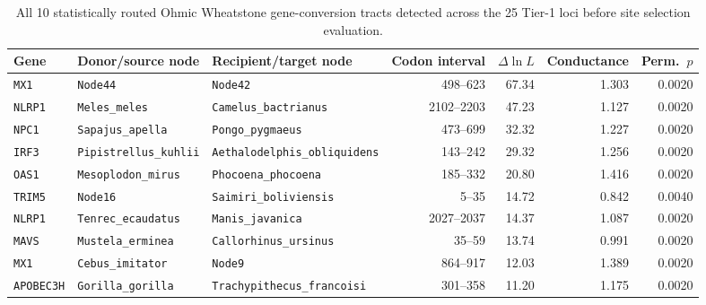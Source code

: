 \begin{table}[htbp]
\centering
\caption{All 10 statistically routed Ohmic Wheatstone gene-conversion tracts detected across the 25 Tier-1 loci before site selection evaluation.}
\label{tab:s3_wheatstone}
\footnotesize
\setlength{\tabcolsep}{4.5pt}
\begin{adjustbox}{max width=\textwidth}
\begin{tabular}{@{}l l l r r r r@{}}
\toprule
Gene & Donor/source node & Recipient/target node & Codon interval & $\Delta \ln L$ & Conductance & Perm.\ $p$ \\
\midrule
\texttt{MX1} & \texttt{Node44} & \texttt{Node42} & 498--623 & 67.34 & 1.303 & 0.0020 \\
\texttt{NLRP1} & \texttt{Meles\_meles} & \texttt{Camelus\_bactrianus} & 2102--2203 & 47.23 & 1.127 & 0.0020 \\
\texttt{NPC1} & \texttt{Sapajus\_apella} & \texttt{Pongo\_pygmaeus} & 473--699 & 32.32 & 1.227 & 0.0020 \\
\texttt{IRF3} & \texttt{Pipistrellus\_kuhlii} & \texttt{Aethalodelphis\_obliquidens} & 143--242 & 29.32 & 1.256 & 0.0020 \\
\texttt{OAS1} & \texttt{Mesoplodon\_mirus} & \texttt{Phocoena\_phocoena} & 185--332 & 20.80 & 1.416 & 0.0020 \\
\texttt{TRIM5} & \texttt{Node16} & \texttt{Saimiri\_boliviensis} & 5--35 & 14.72 & 0.842 & 0.0040 \\
\texttt{NLRP1} & \texttt{Tenrec\_ecaudatus} & \texttt{Manis\_javanica} & 2027--2037 & 14.37 & 1.087 & 0.0020 \\
\texttt{MAVS} & \texttt{Mustela\_erminea} & \texttt{Callorhinus\_ursinus} & 35--59 & 13.74 & 0.991 & 0.0020 \\
\texttt{MX1} & \texttt{Cebus\_imitator} & \texttt{Node9} & 864--917 & 12.03 & 1.389 & 0.0020 \\
\texttt{APOBEC3H} & \texttt{Gorilla\_gorilla} & \texttt{Trachypithecus\_francoisi} & 301--358 & 11.20 & 1.175 & 0.0020 \\
\bottomrule
\end{tabular}
\end{adjustbox}
\end{table}

